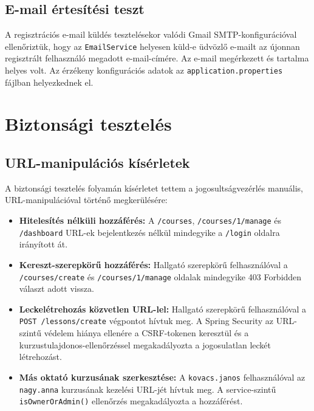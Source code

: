 \subsection{E-mail értesítési teszt}

A regisztrációs e-mail küldés tesztelésekor valódi Gmail SMTP-konfigurációval ellenőriztük, hogy az \texttt{EmailService} helyesen küld-e üdvözlő e-mailt az újonnan regisztrált felhasználó megadott e-mail-címére. Az e-mail megérkezett és tartalma helyes volt. Az érzékeny konfigurációs adatok az \texttt{application.properties} fájlban helyezkednek el.

\section{Biztonsági tesztelés}

\subsection{URL-manipulációs kísérletek}

A biztonsági tesztelés folyamán kísérletet tettem a jogosultságvezérlés manuális, URL-manipulációval történő megkerülésére:

\begin{itemize}
    \item \textbf{Hitelesítés nélküli hozzáférés:} A \texttt{/courses}, \texttt{/courses/1/manage} és \texttt{/dashboard} URL-ek bejelentkezés nélkül mindegyike a \texttt{/login} oldalra irányított át.
    \item \textbf{Kereszt-szerepkörű hozzáférés:} Hallgató szerepkörű felhasználóval a \texttt{/courses/create} és \texttt{/courses/1/manage} oldalak mindegyike 403 Forbidden választ adott vissza.
    \item \textbf{Leckelétrehozás közvetlen URL-lel:} Hallgató szerepkörű felhasználóval a \texttt{POST /lessons/create} végpontot hívtuk meg. A Spring Security az URL-szintű védelem hiánya ellenére a CSRF-tokenen keresztül és a kurzustulajdonos-ellenőrzéssel megakadályozta a jogosulatlan leckét létrehozást.
    \item \textbf{Más oktató kurzusának szerkesztése:} A \texttt{kovacs.janos} felhasználóval az \texttt{nagy.anna} kurzusának kezelési URL-jét hívtuk meg. A service-szintű \texttt{isOwnerOrAdmin()} ellenőrzés megakadályozta a hozzáférést.
\end{itemize}

